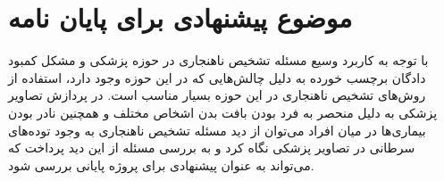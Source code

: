 \documentclass[12pt,a4paper]{report}
\theoremstyle{definition}
\theoremstyle{definition}
\begin{document}
	\section{موضوع پیشنهادی برای پایان نامه}
با توجه به کاربرد وسیع مسئله تشخیص ناهنجاری در حوزه پزشکی و مشکل کمبود دادگان برچسب خورده به دلیل چالش‌هایی که در این حوزه وجود دارد، استفاده از روش‌های تشخیص ناهنجاری در این حوزه بسیار مناسب است. در پردازش تصاویر پزشکی به دلیل منحصر به فرد بودن بافت بدن اشخاص مختلف و همچنین نادر بودن بیماری‌ها در میان افراد می‌توان از دید مسئله تشخیص ناهنجاری به وجود توده‌های سرطانی در تصاویر پزشکی نگاه کرد و به بررسی مسئله از این دید پرداخت که می‌تواند به عنوان پیشنهادی برای پروژه پایانی بررسی شود.
	
	
	\newpage


\end{document}
